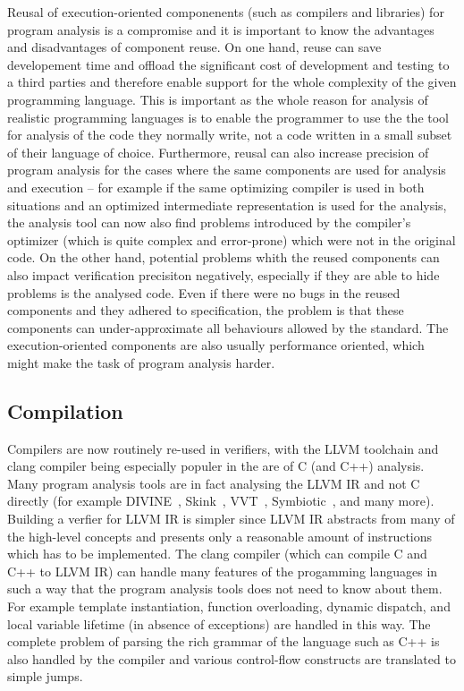 Reusal of execution-oriented componenents (such as compilers and libraries) for
program analysis is a compromise and it is important to know the advantages and
disadvantages of component reuse.
On one hand, reuse can save developement time and offload the significant cost
of development and testing to a third parties and therefore enable support for the whole complexity of the given programming language.
This is important as the whole reason for analysis of realistic programming languages is to enable the programmer to use the the tool for analysis of the code they normally write, not a code written in a small subset of their language of choice.
Furthermore, reusal can also increase precision of program analysis for the cases where the same components are used for analysis and execution -- for example if the same optimizing compiler is used in both situations and an optimized intermediate representation is used for the analysis, the analysis tool can now also find problems introduced by the compiler's optimizer (which is quite complex and error-prone) which were not in the original code.
On the other hand, potential problems whith the reused components can also
impact verification precisiton negatively, especially if they are able to hide
problems is the analysed code.
Even if there were no bugs in the reused components and they adhered to specification, the problem is that these components can under-approximate all behaviours allowed by the standard.
The execution-oriented components are also usually performance oriented, which might make the task of program analysis harder.

\subsection{Compilation}

Compilers are now routinely re-used in verifiers, with the LLVM toolchain and
clang compiler being especially populer in the are of C (and C++) analysis.
Many program analysis tools are in fact analysing the LLVM IR and not C
directly (for example DIVINE~,
Skink~, VVT~, Symbiotic~,
and many more).
Building a verfier for LLVM IR is simpler since LLVM IR abstracts from many of
the high-level concepts and presents only a reasonable amount of instructions
which has to be implemented.
The clang compiler (which can compile C and C++ to LLVM IR) can handle many
features of the progamming languages in such a way that the program analysis
tools does not need to know about them.
For example template instantiation, function overloading, dynamic dispatch, and
local variable lifetime (in absence of exceptions) are handled in this way.
The complete problem of parsing the rich grammar of the language such as C++ is
also handled by the compiler and various control-flow constructs are translated
to simple jumps.

